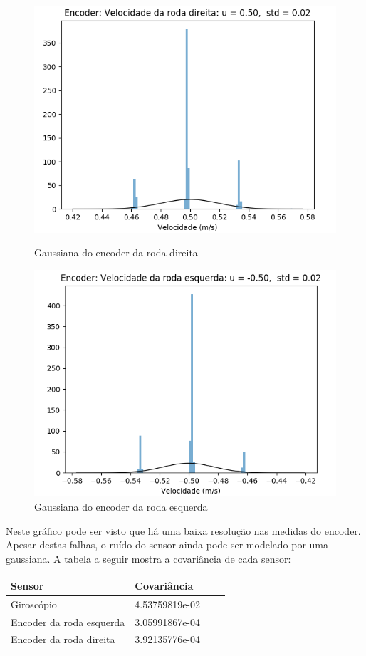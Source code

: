 \documentclass[
	12pt,				%
	openright,			%
	twoside,			%
	convert,
	a4paper,			%
	english,			%
	french,				%
	spanish,			%
	brazil				%
	]{abntex2}
\begin{document}
\begin{figure}[H]
  \centering
  \begin{minipage}[b]{0.45\textwidth}
    \includegraphics[width=\textwidth]{encoder_roda_direita_gaussiana}
    \caption{Gaussiana do encoder da roda direita}
  \end{minipage}
  \begin{minipage}[b]{0.45\textwidth}
    \includegraphics[width=\textwidth]{encoder_roda_esquerda_gaussiana}
    \caption{Gaussiana do encoder da roda esquerda}
  \end{minipage}
\end{figure}
Neste gráfico pode ser visto que há uma baixa resolução nas medidas do encoder. Apesar destas falhas, o ruído do sensor ainda pode ser modelado por uma gaussiana. A tabela a seguir mostra a covariância de cada sensor:
\begin{center}
\begin{tabular}{ | l | l | l | p{5cm} |}
    \hline
    Sensor & Covariância \\ \hline
    Giroscópio & 4.53759819e-02 \\ \hline
    Encoder da roda esquerda & 3.05991867e-04 \\ \hline
    Encoder da roda direita &  3.92135776e-04 \\
    \hline
\end{tabular}
\end{center}
\end{document}
